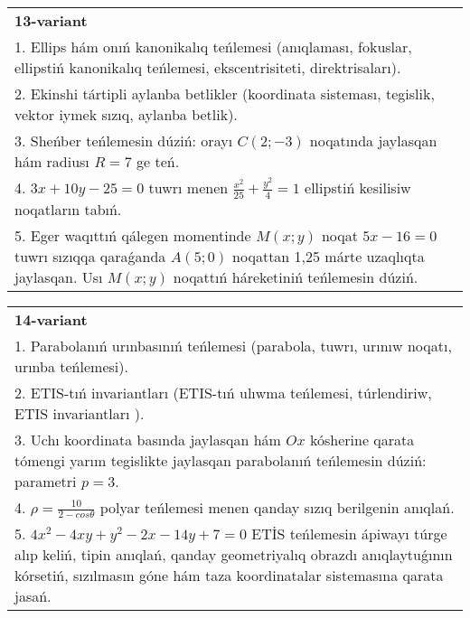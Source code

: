 \documentclass{article}
\begin{document}
\begin{tabular}{m{17cm}}
\textbf{13-variant}\\
1. Ellips hám onıń kanonikalıq teńlemesi (anıqlaması, fokuslar, ellipstiń kanonikalıq teńlemesi, ekscentrisiteti, direktrisaları).\\

2. Ekinshi tártipli aylanba betlikler (koordinata sisteması, tegislik, vektor iymek sızıq, aylanba betlik).\\

3. Sheńber teńlemesin dúziń: orayı $C (2;-3) $ noqatında jaylasqan hám radiusı $R=7$ ge teń.\\

4. $3x + 10y - 25 = 0$ tuwrı menen $\frac{x^{2}}{25} + \frac{y^{2}}{4} = 1$ ellipstiń kesilisiw noqatların tabıń.\\

5. Eger waqıttıń qálegen momentinde $M(x;y)$ noqat $5x - 16 = 0$ tuwrı sızıqqa qaraǵanda $A(5;0)$ noqattan 1,25 márte uzaqlıqta jaylasqan. Usı $M(x;y)$ noqattıń háreketiniń teńlemesin dúziń.  
\end{tabular}
\vspace{1cm}


\begin{tabular}{m{17cm}}
\textbf{14-variant}\\
1. Parabolanıń urınbasınıń teńlemesi (parabola, tuwrı, urınıw noqatı, urınba teńlemesi).\\

2. ETIS-tıń invariantları (ETIS-tıń ulıwma teńlemesi, túrlendiriw, ETIS invariantları ).\\

3. Uchı koordinata basında jaylasqan hám $Ox$ kósherine qarata tómengi yarım tegislikte jaylasqan parabolanıń teńlemesin dúziń: parametri $p=3$.\\

4. $\rho = \frac{10}{2 - cos\theta}$ polyar teńlemesi menen qanday sızıq berilgenin anıqlań.  \\

5. $4x^{2} - 4xy + y^{2} - 2x - 14y + 7 = 0$ ETİS teńlemesin ápiwayı túrge alıp keliń, tipin anıqlań, qanday geometriyalıq obrazdı anıqlaytuǵının kórsetiń, sızılmasın góne hám taza koordinatalar sistemasına qarata jasań.  
\end{tabular}
\vspace{1cm}
\end{document}
